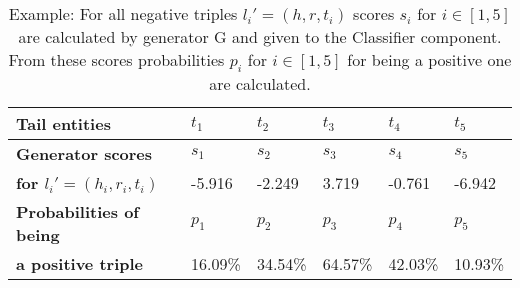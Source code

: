 \begin{table}[H]
    \centering
    \begin{tabular}{llllll}
        \toprule
        
        \textbf{Tail entities}
        &  \textbf{$t_1$} & \textbf{$t_2$} & \textbf{$t_3$} & \textbf{$t_4$} & \textbf{$t_5$} \\
         
        \midrule
        
        \textbf{Generator scores}
         & $s_1$ & $s_2$ & $s_3$ & $s_4$ & $s_5$ \\
        
        \textbf{for $l_i' = (h_i, r_i, t_i)$}
        & -5.916 
        & -2.249  
        & 3.719 
        & -0.761 
        & -6.942 \\
        
        \midrule
                        
        \textbf{Probabilities of being} 
        & $p_1$ & $p_2$ & $p_3$ & $p_4$ & $p_5$ \\
        
        \textbf{a positive triple}
        & 16.09\% 
        & 34.54\% 
        & 64.57\% 
        & 42.03\% 
        & 10.93\%  \\

        \bottomrule
    \end{tabular}
    \caption{Example: For all negative triples $l_i' = (h, r, t_i)$ scores $s_i$ for $i \in [1,5]$ are calculated by generator G and given to the Classifier component.
    From these scores probabilities $p_i$ for $i \in [1, 5]$ for being a positive one are calculated.}
\label{tab:positive_probabilities}
\end{table}